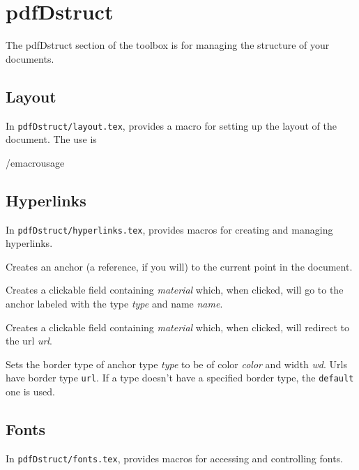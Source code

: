 \section{pdfDstruct}

The pdfDstruct section of the \pdftoolbox{} toolbox is for managing the structure of your documents.

\subsection{Layout}

In {\tt pdfDstruct/layout.tex}, \pdftoolbox{} provides a macro \macro\setlayout\anchormacro\setlayout{} for setting up the layout of the document.
The use is

\macrousage\setlayout {[page width=<wd>,] [page height=<ht>,] [horizontal margin=<mwd>,]
[vertical margin=<vwd>]}/emacrousage

\subsection{Hyperlinks}

In {\tt pdfDstruct/hyperlinks.tex}, \pdftoolbox{} provides macros for creating and managing hyperlinks.

Creates an anchor (a reference, if you will) to the current point in the document.
\emacroexp

Creates a clickable field containing {\it material} which, when clicked, will go to the anchor labeled with the type {\it type} and name {\it name}.
\emacroexp

Creates a clickable field containing {\it material} which, when clicked, will redirect to the url {\it url}.
\emacroexp

Sets the border type of anchor type {\it type} to be of color {\it color} and width {\it wd}.
Urls have border type {\tt url}.
If a type doesn't have a specified border type, the {\tt default} one is used.
\emacroexp

\subsection{Fonts}

In {\tt pdfDstruct/fonts.tex}, \pdftoolbox{} provides macros for accessing and controlling fonts.

